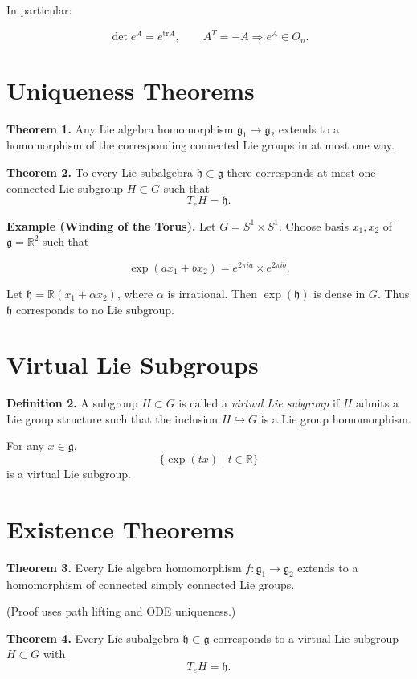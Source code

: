 In particular:

\[
\det e^A = e^{\mathrm{tr} A},
\qquad
A^T=-A \Rightarrow e^A \in O_n.
\]

\section*{Uniqueness Theorems}

\textbf{Theorem 1.}
Any Lie algebra homomorphism
$\mathfrak g_1 \to \mathfrak g_2$
extends to a homomorphism of the corresponding connected Lie groups
in at most one way.

\textbf{Theorem 2.}
To every Lie subalgebra $\mathfrak h \subset \mathfrak g$
there corresponds at most one connected Lie subgroup
$H\subset G$ such that
\[
T_eH=\mathfrak h.
\]

\textbf{Example (Winding of the Torus).}
Let $G=S^1\times S^1$.
Choose basis $x_1,x_2$ of $\mathfrak g=\mathbb R^2$ such that

\[
\exp(ax_1+bx_2)
=
e^{2\pi i a}\times e^{2\pi i b}.
\]

Let $\mathfrak h=\mathbb R(x_1+\alpha x_2)$,
where $\alpha$ is irrational.
Then $\exp(\mathfrak h)$ is dense in $G$.
Thus $\mathfrak h$ corresponds to no Lie subgroup.

\section*{Virtual Lie Subgroups}

\textbf{Definition 2.}
A subgroup $H\subset G$ is called a \emph{virtual Lie subgroup}
if $H$ admits a Lie group structure such that
the inclusion $H\hookrightarrow G$ is a Lie group homomorphism.

For any $x\in\mathfrak g$,
\[
\{\exp(tx)\mid t\in\mathbb R\}
\]
is a virtual Lie subgroup.

\section*{Existence Theorems}

\textbf{Theorem 3.}
Every Lie algebra homomorphism
$f:\mathfrak g_1\to\mathfrak g_2$
extends to a homomorphism of connected simply connected Lie groups.

(Proof uses path lifting and ODE uniqueness.)

\textbf{Theorem 4.}
Every Lie subalgebra $\mathfrak h\subset\mathfrak g$
corresponds to a virtual Lie subgroup $H\subset G$
with
\[
T_eH=\mathfrak h.
\]

